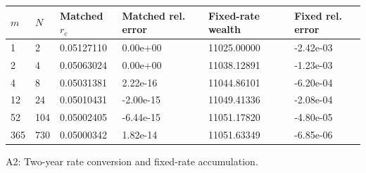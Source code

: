 \begin{center}
\small
\begin{tabular}{llllll}
\toprule
$m$ & $N$ & Matched $r_c$ & Matched rel. error & Fixed-rate wealth & Fixed rel. error\\
\midrule
1 & 2 & 0.05127110 & 0.00e+00 & 11025.00000 & -2.42e-03\\
2 & 4 & 0.05063024 & 0.00e+00 & 11038.12891 & -1.23e-03\\
4 & 8 & 0.05031381 & 2.22e-16 & 11044.86101 & -6.20e-04\\
12 & 24 & 0.05010431 & -2.00e-15 & 11049.41336 & -2.08e-04\\
52 & 104 & 0.05002405 & -6.44e-15 & 11051.17820 & -4.80e-05\\
365 & 730 & 0.05000342 & 1.82e-14 & 11051.63349 & -6.85e-06\\
\bottomrule
\end{tabular}
\par\smallskip A2: Two-year rate conversion and fixed-rate accumulation.
\end{center}